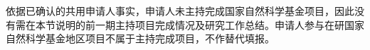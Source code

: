 \justifying
\NSFCBodyText

依据已确认的共用申请人事实，申请人未主持完成国家自然科学基金项目，因此没有需在本节说明的前一期主持项目完成情况及研究工作总结。申请人参与在研国家自然科学基金地区项目不属于主持完成项目，不作替代填报。
